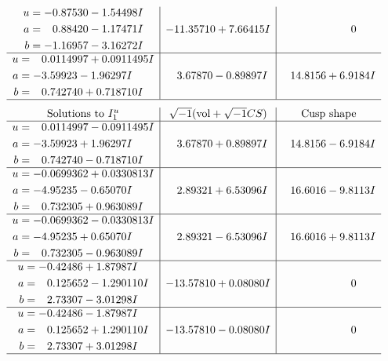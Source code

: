 \documentclass[1p]{elsarticle_modified}
\theoremstyle{definition}
\newcommand{\I}{\sqrt{-1}}
\begin{document}
$$\begin{array}{c|c|c}
\begin{aligned}
u &= -0.87530 - 1.54498 I \\
a &= \phantom{-}0.88420 - 1.17471 I \\
b &= -1.16957 - 3.16272 I\end{aligned}
 & -11.35710 + 7.66415 I & \phantom{-0.000000 } 0 \\ \hline\begin{aligned}
u &= \phantom{-}0.0114997 + 0.0911495 I \\
a &= -3.59923 - 1.96297 I \\
b &= \phantom{-}0.742740 + 0.718710 I\end{aligned}
 & \phantom{-}3.67870 - 0.89897 I & \phantom{-}14.8156 + 6.9184 I\\
 \hline 
 \end{array}$$\newpage$$\begin{array}{c|c|c}  
\text{Solutions to }I^u_{1}& \I (\text{vol} + \sqrt{-1}CS) & \text{Cusp shape}\\
 \hline 
\begin{aligned}
u &= \phantom{-}0.0114997 - 0.0911495 I \\
a &= -3.59923 + 1.96297 I \\
b &= \phantom{-}0.742740 - 0.718710 I\end{aligned}
 & \phantom{-}3.67870 + 0.89897 I & \phantom{-}14.8156 - 6.9184 I \\ \hline\begin{aligned}
u &= -0.0699362 + 0.0330813 I \\
a &= -4.95235 - 0.65070 I \\
b &= \phantom{-}0.732305 + 0.963089 I\end{aligned}
 & \phantom{-}2.89321 + 6.53096 I & \phantom{-}16.6016 - 9.8113 I \\ \hline\begin{aligned}
u &= -0.0699362 - 0.0330813 I \\
a &= -4.95235 + 0.65070 I \\
b &= \phantom{-}0.732305 - 0.963089 I\end{aligned}
 & \phantom{-}2.89321 - 6.53096 I & \phantom{-}16.6016 + 9.8113 I \\ \hline\begin{aligned}
u &= -0.42486 + 1.87987 I \\
a &= \phantom{-}0.125652 - 1.290110 I \\
b &= \phantom{-}2.73307 - 3.01298 I\end{aligned}
 & -13.57810 + 0.08080 I & \phantom{-0.000000 } 0 \\ \hline\begin{aligned}
u &= -0.42486 - 1.87987 I \\
a &= \phantom{-}0.125652 + 1.290110 I \\
b &= \phantom{-}2.73307 + 3.01298 I\end{aligned}
 & -13.57810 - 0.08080 I & \phantom{-0.000000 } 0\\
 \hline 
 \end{array}$$\newpage\newpage\renewcommand{\arraystretch}{1}
\end{document}
